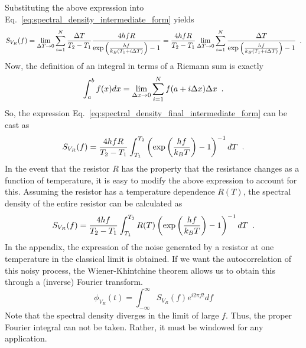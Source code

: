 \documentclass{article}
\begin{document}
Substituting the above expression into
Eq.~\ref{eq:spectral_density_intermediate_form} yields
\begin{equation}
   S_{V_{R}}(f) = \lim_{\Delta T \rightarrow 0}\sum^{N}_{i=1} \frac{\Delta
   T}{T_{2} - T_{1}}\frac{4 h f R}{\exp\left(\frac{hf}{k_{B} \left( T_{1} + i \Delta T \right)}\right)-1}
   = \frac{4 h f R}{T_{2} - T_{1}}\lim_{\Delta T \rightarrow 0}\sum^{N}_{i=1}
   \frac{\Delta T}{\exp\left(\frac{hf}{k_{B} \left( T_{1} + i
   \Delta T \right)}\right)-1} \enskip.
   \label{eq:spectral_density_final_intermediate_form}
\end{equation}
Now, the definition of an integral in terms of a Riemann sum is exactly
\begin{equation}
   \int_{a}^{b} f(x) dx = \lim_{\Delta x \rightarrow 0} \sum^{N}_{i=1} f(a +
   i \Delta x) \Delta x \enskip.
\end{equation}
So, the expression Eq.~\ref{eq:spectral_density_final_intermediate_form} can be
cast as
\begin{equation}
   S_{V_{R}}(f) = \frac{4 h f R}{T_{2} - T_{1}} \int_{T_{1}}^{T_{2}} \left(
   \exp\left( \frac{hf}{k_{B}T}\right) - 1 \right)^{-1} dT \enskip.
   \label{eq:spectral_density_of_resistor_in_integral_form}
\end{equation}
In the event that the resistor $ R $ has the property that the resistance
changes as a function of temperature, it is easy to modify the above expression
to account for this. Assuming the resistor has a temperature dependence $ R(T)
$, the spectral density of the entire resistor can be calculated as
\begin{equation}
   S_{V_{R}}(f) = \frac{4 h f}{T_{2} - T_{1}} \int_{T_{1}}^{T_{2}} R(T) \left(
   \exp\left( \frac{hf}{k_{B}T}\right) - 1 \right)^{-1} dT \enskip.
   \label{eq:spectral_density_of_entire_resistor_in_integral_form}
\end{equation}
In the appendix, the expression of the noise generated by a resistor at one
temperature in the classical limit is obtained. If we want the autocorrelation
of this noisy process, the Wiener-Khintchine theorem allows us to obtain this
through a (inverse) Fourier transform.
\begin{equation}
   \phi_{V_{R}}(t) = \int_{-\infty}^{\infty} S_{V_{R}}(f) e^{i
   2 \pi f t} df
\end{equation}
Note that the spectral density diverges in the limit of large $ f $. Thus, the
proper Fourier integral can not be taken. Rather, it must be windowed for any
application.
\end{document}
